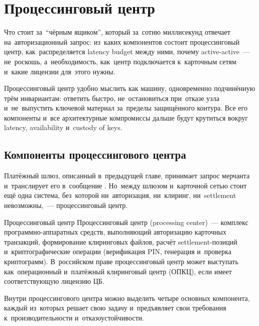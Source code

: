 \chapter{Процессинговый центр}
\label{ch:processing-center}

\begin{kaobox}[title=Что вы узнаете из этой главы]
  Что стоит за~\enquote{чёрным ящиком}, который за~сотню
  миллисекунд отвечает на~авторизационный запрос: из~каких
  компонентов состоит процессинговый центр, как~распределяется
  latency budget между ними, почему active-active~--- не~роскошь,
  а~необходимость, как~центр подключается к~карточным сетям
  и~какие лицензии для~этого нужны.
\end{kaobox}

Процессинговый центр удобно мыслить как машину, одновременно
подчинённую трём инвариантам: ответить быстро, не~остановиться
при~отказе узла и~не~выпустить ключевой материал за~пределы
защищённого контура. Все его компоненты и~все архитектурные
компромиссы дальше будут крутиться вокруг latency, availability
и~custody of keys.

\section{Компоненты процессингового центра}
\label{sec:pc-components}

Платёжный шлюз, описанный в~предыдущей главе, принимает запрос
мерчанта и~транслирует его в~сообщение . Но~между
шлюзом и~карточной сетью стоит ещё одна система, без~которой
ни~авторизация, ни~клиринг, ни~settlement невозможны,~---
процессинговый центр.

\begin{termdef}{Процессинговый центр}
  Процессинговый центр (processing center)~--- комплекс
  программно-аппаратных средств, выполняющий авторизацию
  карточных транзакций, формирование клиринговых файлов,
  расчёт settlement-позиций и~криптографические операции
  (верификация PIN, генерация и~проверка криптограмм).
  В~российском праве процессинговый центр может выступать
  как~операционный и~платёжный клиринговый центр (ОПКЦ),
  если имеет соответствующую лицензию ЦБ.
\end{termdef}

Внутри процессингового центра можно выделить четыре основных
компонента, каждый из~которых решает свою задачу и~предъявляет
свои требования к~производительности и~отказоустойчивости.

